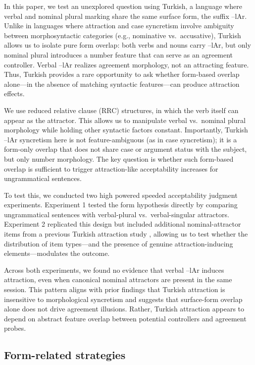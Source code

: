 \documentclass[
  authoryear,
  preprint]{elsarticle}
\begin{document}
In this paper, we test an unexplored question using Turkish, a language
where verbal and nominal plural marking share the same surface form, the
suffix --lAr. Unlike in languages where attraction and case syncretism
involve ambiguity between morphosyntactic categories (e.g., nominative
vs.~accusative), Turkish allows us to isolate pure form overlap: both
verbs and nouns carry --lAr, but only nominal plural introduces a number
feature that can serve as an agreement controller. Verbal --lAr realizes
agreement morphology, not an attracting feature. Thus, Turkish provides
a rare opportunity to ask whether form-based overlap alone---in the
absence of matching syntactic features---can produce attraction effects.

We use reduced relative clause (RRC) structures, in which the verb
itself can appear as the attractor. This allows us to manipulate verbal
vs.~nominal plural morphology while holding other syntactic factors
constant. Importantly, Turkish --lAr syncretism here is not
feature-ambiguous (as in case syncretism); it is a form-only overlap
that does not share case or argument status with the subject, but only
number morphology. The key question is whether such form-based overlap
is sufficient to trigger attraction-like acceptability increases for
ungrammatical sentences.

To test this, we conducted two high powered speeded acceptability
judgment experiments. Experiment 1 tested the form hypothesis directly
by comparing ungrammatical sentences with verbal-plural
vs.~verbal-singular attractors. Experiment 2 replicated this design but
included additional nominal-attractor items from a previous Turkish
attraction study \citep{TurkLogacev2024}, allowing us to test whether
the distribution of item types---and the presence of genuine
attraction-inducing elements---modulates the outcome.

Across both experiments, we found no evidence that verbal --lAr induces
attraction, even when canonical nominal attractors are present in the
same session. This pattern aligns with prior findings that Turkish
attraction is insensitive to morphological syncretism
\citep{TurkLogacev2024} and suggests that surface-form overlap alone
does not drive agreement illusions. Rather, Turkish attraction appears
to depend on abstract feature overlap between potential controllers and
agreement probes.

\subsection{Form-related strategies}\label{form-related-strategies}
\end{document}
